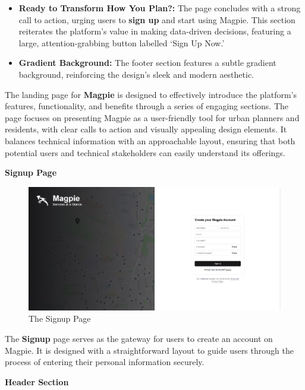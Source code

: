 \begin{itemize}
    \item{} \textbf{Ready to Transform How You Plan?:} The page concludes with a
    strong call to action, urging users to \textbf{sign up} and start using
    Magpie. This section reiterates the platform's value in making data{-}driven
    decisions, featuring a large, attention{-}grabbing button labelled `Sign Up
    Now.'
    \item{} \textbf{Gradient Background:} The footer section features a subtle
    gradient background, reinforcing the design's sleek and modern aesthetic.
\end{itemize}

The landing page for \textbf{Magpie} is designed to effectively introduce the
platform's features, functionality, and benefits through a series of engaging
sections. The page focuses on presenting Magpie as a user{-}friendly tool for
urban planners and residents, with clear calls to action and visually appealing
design elements. It balances technical information with an approachable layout,
ensuring that both potential users and technical stakeholders can easily
understand its offerings.

\textbf{Signup Page}

\begin{figure}[htbp]
    \centering{}
    \includegraphics[width=1\textwidth]{images/site/signup/signup_page.png}
    \caption{The Signup Page}
\end{figure}

The \textbf{Signup} page serves as the gateway for users to create an account on
Magpie. It is designed with a straightforward layout to guide users through the
process of entering their personal information securely.

\textbf{Header Section}

